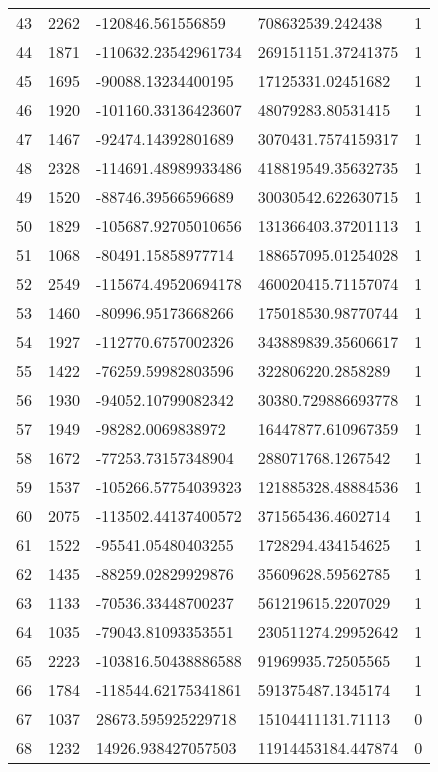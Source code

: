 \begin{longtable}{lllll}
    43 & 2262 & -120846.561556859 & 708632539.242438 & 1 \\
    44 & 1871 & -110632.23542961734 & 269151151.37241375 & 1 \\
    45 & 1695 & -90088.13234400195 & 17125331.02451682 & 1 \\
    46 & 1920 & -101160.33136423607 & 48079283.80531415 & 1 \\
    47 & 1467 & -92474.14392801689 & 3070431.7574159317 & 1 \\
    48 & 2328 & -114691.48989933486 & 418819549.35632735 & 1 \\
    49 & 1520 & -88746.39566596689 & 30030542.622630715 & 1 \\
    50 & 1829 & -105687.92705010656 & 131366403.37201113 & 1 \\
    51 & 1068 & -80491.15858977714 & 188657095.01254028 & 1 \\
    52 & 2549 & -115674.49520694178 & 460020415.71157074 & 1 \\
    53 & 1460 & -80996.95173668266 & 175018530.98770744 & 1 \\
    54 & 1927 & -112770.6757002326 & 343889839.35606617 & 1 \\
    55 & 1422 & -76259.59982803596 & 322806220.2858289 & 1 \\
    56 & 1930 & -94052.10799082342 & 30380.729886693778 & 1 \\
    57 & 1949 & -98282.0069838972 & 16447877.610967359 & 1 \\
    58 & 1672 & -77253.73157348904 & 288071768.1267542 & 1 \\
    59 & 1537 & -105266.57754039323 & 121885328.48884536 & 1 \\
    60 & 2075 & -113502.44137400572 & 371565436.4602714 & 1 \\
    61 & 1522 & -95541.05480403255 & 1728294.434154625 & 1 \\
    62 & 1435 & -88259.02829929876 & 35609628.59562785 & 1 \\
    63 & 1133 & -70536.33448700237 & 561219615.2207029 & 1 \\
    64 & 1035 & -79043.81093353551 & 230511274.29952642 & 1 \\
    65 & 2223 & -103816.50438886588 & 91969935.72505565 & 1 \\
    66 & 1784 & -118544.62175341861 & 591375487.1345174 & 1 \\
    67 & 1037 & 28673.595925229718 & 15104411131.71113 & 0 \\
    68 & 1232 & 14926.938427057503 & 11914453184.447874 & 0 \\

\end{longtable}
